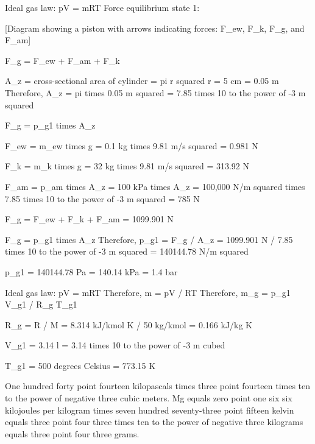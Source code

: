 Ideal gas law: pV = mRT  
Force equilibrium state 1: 

[Diagram showing a piston with arrows indicating forces: F_ew, F_k, F_g, and F_am]

F_g = F_ew + F_am + F_k  

A_z = cross-sectional area of cylinder = pi r squared  
r = 5 cm = 0.05 m  
Therefore, A_z = pi times 0.05 m squared = 7.85 times 10 to the power of -3 m squared  

F_g = p_g1 times A_z  

F_ew = m_ew times g = 0.1 kg times 9.81 m/s squared = 0.981 N  

F_k = m_k times g = 32 kg times 9.81 m/s squared = 313.92 N  

F_am = p_am times A_z = 100 kPa times A_z = 100,000 N/m squared times 7.85 times 10 to the power of -3 m squared = 785 N  

F_g = F_ew + F_k + F_am = 1099.901 N  

F_g = p_g1 times A_z  
Therefore, p_g1 = F_g / A_z = 1099.901 N / 7.85 times 10 to the power of -3 m squared = 140144.78 N/m squared  

p_g1 = 140144.78 Pa = 140.14 kPa = 1.4 bar  

Ideal gas law: pV = mRT  
Therefore, m = pV / RT  
Therefore, m_g = p_g1 V_g1 / R_g T_g1  

R_g = R / M = 8.314 kJ/kmol K / 50 kg/kmol = 0.166 kJ/kg K  

V_g1 = 3.14 l = 3.14 times 10 to the power of -3 m cubed  

T_g1 = 500 degrees Celsius = 773.15 K

One hundred forty point fourteen kilopascals times three point fourteen times ten to the power of negative three cubic meters.  
Mg equals zero point one six six kilojoules per kilogram times seven hundred seventy-three point fifteen kelvin equals three point four three times ten to the power of negative three kilograms equals three point four three grams.
